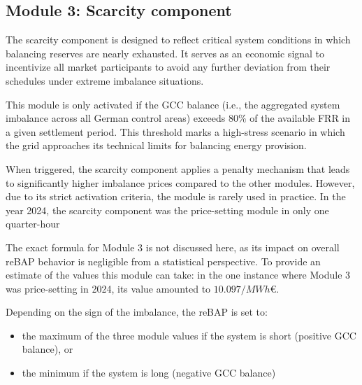 \documentclass[class=scrbook, crop=false]{standalone}
\begin{document}
\subsection{Module 3: Scarcity component}




The scarcity component is designed to reflect critical system conditions in which balancing reserves are nearly exhausted. It serves as an economic signal to incentivize all market participants to avoid any further deviation from their schedules under extreme imbalance situations.

This module is only activated if the \gls{GCC} balance (i.e., the aggregated system imbalance across all German control areas) exceeds 80\% of the available \gls{FRR} in a given settlement period. This threshold marks a high-stress scenario in which the grid approaches its technical limits for balancing energy provision.

When triggered, the scarcity component applies a penalty mechanism that leads to significantly higher imbalance prices compared to the other modules. However, due to its strict activation criteria, the module is rarely used in practice. In the year 2024, the scarcity component was the price-setting module in only one quarter-hour 

The exact formula for Module 3 is not discussed here, as its impact on overall \gls{reBAP} behavior is negligible from a statistical perspective. 
To provide an estimate of the values this module can take: in the one instance where Module 3 was price-setting in 2024, its value amounted to $10.097/MWh€$. 

Depending on the sign of the imbalance, the \gls{reBAP} is set to:
\begin{itemize}
\item the maximum of the three module values if the system is short (positive \gls{GCC} balance), or
\item the minimum if the system is long (negative \gls{GCC} balance)
\end{itemize}
\end{document}
